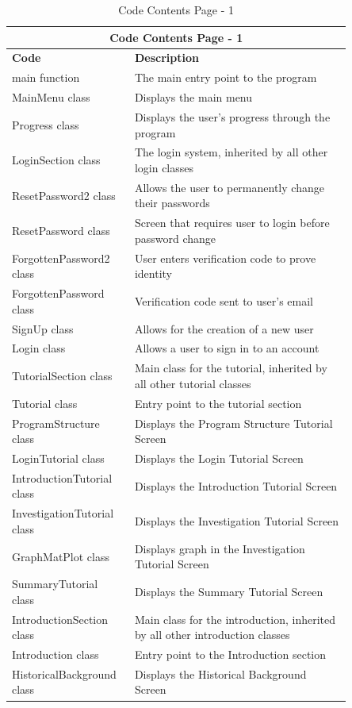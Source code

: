 \documentclass[12pt]{article}
\begin{document}
\begin{table}[ht]
    \centering
    \begin{tabular}{|p{0.26\linewidth}|p{0.59\linewidth}|}
    \hline
    \multicolumn{2}{|c|}{\textbf{Code Contents Page - 1}}\\
    \hline
    \hline
    \textbf{Code} & \textbf{Description}\\
    \hline
    main function & The main entry point to the program\\
    \hline
    MainMenu class & Displays the main menu\\
    \hline
    Progress class & Displays the user's progress through the program\\
    \hline
    LoginSection class & The login system, inherited by all other login classes\\
    \hline
    ResetPassword2 class & Allows the user to permanently change their passwords\\
    \hline
    ResetPassword class & Screen that requires user to login before password change\\
    \hline
    ForgottenPassword2 class & User enters verification code to prove identity\\
    \hline
    ForgottenPassword class & Verification code sent to user's email\\
    \hline
    SignUp class & Allows for the creation of a new user\\
    \hline
    Login class & Allows a user to sign in to an account\\
    \hline
    TutorialSection class & Main class for the tutorial, inherited by all other tutorial classes\\
    \hline
    Tutorial class & Entry point to the tutorial section\\
    \hline
    ProgramStructure class & Displays the Program Structure Tutorial Screen\\
    \hline
    LoginTutorial class & Displays the Login Tutorial Screen\\
    \hline
    IntroductionTutorial class & Displays the Introduction Tutorial Screen\\
    \hline
    InvestigationTutorial class & Displays the Investigation Tutorial Screen\\
    \hline
    GraphMatPlot class & Displays graph in the Investigation Tutorial Screen\\
    \hline
    SummaryTutorial class & Displays the Summary Tutorial Screen\\
    \hline
    IntroductionSection class & Main class for the introduction, inherited by all other introduction classes\\
    \hline
    Introduction class & Entry point to the Introduction section\\
    \hline
    HistoricalBackground class & Displays the Historical Background Screen\\
    \hline
    \end{tabular}
    \caption{Code Contents Page - 1}
\end{table}
\clearpage
\end{document}
